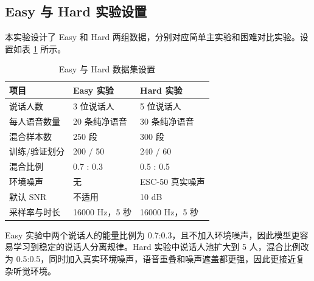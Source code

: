 \subsection{Easy 与 Hard 实验设置}

本实验设计了 Easy 和 Hard 两组数据，分别对应简单主实验和困难对比实验。设置如表 \ref{tab:data_setting} 所示。

\begin{table}[H]
    \centering
    \caption{Easy 与 Hard 数据集设置}
    \label{tab:data_setting}
    \begin{tabularx}{\textwidth}{lXX}
        \toprule
        项目 & Easy 实验 & Hard 实验 \\
        \midrule
        说话人数 & 3 位说话人 & 5 位说话人 \\
        每人语音数量 & 20 条纯净语音 & 30 条纯净语音 \\
        混合样本数 & 250 段 & 300 段 \\
        训练/验证划分 & 200 / 50 & 240 / 60 \\
        混合比例 & 0.7 : 0.3 & 0.5 : 0.5 \\
        环境噪声 & 无 & ESC-50 真实噪声 \\
        默认 SNR & 不适用 & 10 dB \\
        采样率与时长 & 16000 Hz，5 秒 & 16000 Hz，5 秒 \\
        \bottomrule
    \end{tabularx}
\end{table}

Easy 实验中两个说话人的能量比例为 0.7:0.3，且不加入环境噪声，因此模型更容易学习到稳定的说话人分离规律。Hard 实验中说话人池扩大到 5 人，混合比例改为 0.5:0.5，同时加入真实环境噪声，语音重叠和噪声遮盖都更强，因此更接近复杂听觉环境。
